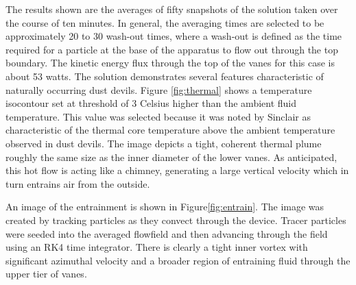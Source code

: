 

The results shown are the averages of fifty snapshots of the solution 
taken over the course of ten minutes. In general, the averaging times
are selected to be approximately 20 to 30 wash-out times, where a
wash-out is defined as the time required for a particle at the base of
the apparatus to flow out through the top boundary. The kinetic energy flux
through the top of the vanes for this case is about 53 watts. The solution
demonstrates several features characteristic of naturally occurring dust
devils. Figure \ref{fig:thermal} shows a temperature isocontour set at
threshold of 3 Celsius higher than the ambient fluid temperature. This
value was selected because it was noted by
Sinclair\cite{Sinclair1969} as characteristic of the thermal core
temperature above the ambient temperature observed in dust devils. The
image depicts a tight, coherent thermal plume roughly the same size as
the inner diameter of the lower vanes. As anticipated, this hot flow is
acting like a chimney, generating a large vertical velocity which in
turn entrains air from the outside.  

An image of the entrainment is shown in Figure\ref{fig:entrain}. The
image was created by tracking particles as they 
convect through the device. Tracer particles were seeded into the
averaged flowfield and then advancing through 
the field using an RK4 time integrator. 
 There is clearly a tight inner vortex with significant azimuthal
 velocity and a broader region of entraining fluid through the
 upper tier of vanes.   

